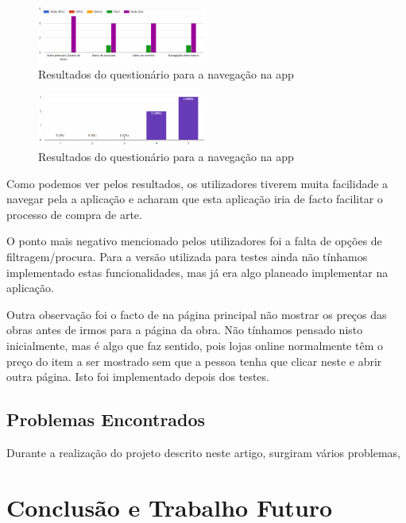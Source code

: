 \documentclass[conference]{IEEEtran}
\begin{document}
\begin{figure}[ht]
    \centering
    \includegraphics[width=0.5\textwidth]{questionarioNavegacao.png}
    \caption{Resultados do questionário para a navegação na app}
    \label{fig:navegacaoTest}
\end{figure}

\begin{figure}[ht]
    \centering
    \includegraphics[width=0.5\textwidth]{questionarioFacilitar.png}
    \caption{Resultados do questionário para a navegação na app}
    \label{fig:facilitaTest}
\end{figure}

Como podemos ver pelos resultados, os utilizadores tiverem muita facilidade a navegar pela a aplicação e acharam que esta aplicação iria de facto facilitar o processo de compra de arte.

O ponto mais negativo mencionado pelos utilizadores foi a falta de opções de filtragem/procura. Para a versão utilizada para testes ainda não tínhamos implementado estas funcionalidades, mas já era algo planeado implementar na aplicação.

Outra observação foi o facto de na página principal não mostrar os preços das obras antes de irmos para a página da obra. Não tínhamos pensado nisto inicialmente, mas é algo que faz sentido, pois lojas online normalmente têm o preço do item a ser mostrado sem que a pessoa tenha que clicar neste e abrir outra página. Isto foi implementado depois dos testes.

\subsection{Problemas Encontrados}

Durante a realização do projeto descrito neste artigo, surgiram vários problemas, 

\section{Conclusão e Trabalho Futuro}



\end{document}
